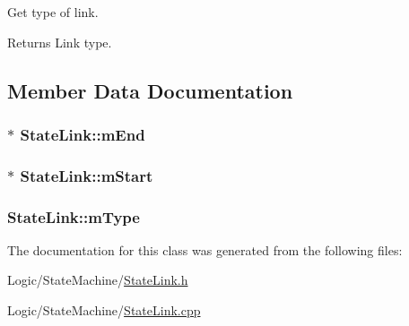 Get type of link. 

\begin{DoxyReturn}{Returns}
Link type. 
\end{DoxyReturn}


\subsection{Member Data Documentation}
\subsubsection[{\texorpdfstring{m\+End}{mEnd}}]{$\ast$ State\+Link\+::m\+End\hspace{0.3cm}{\ttfamily [private]}}\hypertarget{classStateLink_a29e42554da8f4386c681c420ab8a33a0}{}\label{classStateLink_a29e42554da8f4386c681c420ab8a33a0}
\subsubsection[{\texorpdfstring{m\+Start}{mStart}}]{$\ast$ State\+Link\+::m\+Start\hspace{0.3cm}{\ttfamily [private]}}\hypertarget{classStateLink_a47f68e6eb5aebdea10a4604f05c131c9}{}\label{classStateLink_a47f68e6eb5aebdea10a4604f05c131c9}
\subsubsection[{\texorpdfstring{m\+Type}{mType}}]{ State\+Link\+::m\+Type\hspace{0.3cm}{\ttfamily [private]}}\hypertarget{classStateLink_aa7c875d1609337ea950c8d09e9a9d9df}{}\label{classStateLink_aa7c875d1609337ea950c8d09e9a9d9df}


The documentation for this class was generated from the following files\+:\begin{DoxyCompactItemize}
\item 
Logic/\+State\+Machine/\hyperlink{StateLink_8h}{State\+Link.\+h}\item 
Logic/\+State\+Machine/\hyperlink{StateLink_8cpp}{State\+Link.\+cpp}\end{DoxyCompactItemize}
